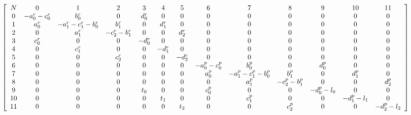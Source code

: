 \documentclass{scrartcl}
\begin{document}
\begin{landscape}
\begin{align*}
  \tiny
  &\left[ {\begin{array}{ccccccccccccc}
N & 0 & 1 & 2 & 3 & 4 & 5 & 6 & 7 & 8 & 9 & 10 & 11 \\
0 &  -a_0^r - c_0^r  & b_0^r & 0 & d_0^r & 0 & 0 & 0 & 0 & 0 & 0 & 0 & 0 \\
1 & a_0^r &  -a_1^r - c_1^r - b_0^r & b_1^r & 0 & d_1^r & 0 & 0 & 0 & 0 & 0 & 0 & 0 \\
2 & 0 & a_1^r &  - c_2^r - b_1^r & 0 & 0 & d_2^r & 0 & 0 & 0 & 0 & 0 & 0 \\
3 & c_0^r & 0 & 0 &  -d_0^r  & 0 & 0 & 0 & 0 & 0 & 0 & 0 & 0 \\
4 & 0 & c_1^r & 0 & 0 &  -d_1^r  & 0 & 0 & 0 & 0 & 0 & 0 & 0 \\
5 & 0 & 0 & c_2^r & 0 & 0 &  -d_2^r  & 0 & 0 & 0 & 0 & 0 & 0 \\
6 & 0 & 0 & 0 & 0 & 0 & 0 &  -a_0^p- c_0^p &  b_0^p & 0 & d_0^p & 0 & 0 \\
7 & 0 & 0 & 0 & 0 & 0 & 0 & a_0^p &  -a_1^p - c_1^p-b_0^p &  b_1^p & 0 & d_1^p & 0 \\
8 & 0 & 0 & 0 & 0 & 0 & 0 & 0 & a_1^p &  - c_2^p - b_1^p & 0 & 0 & d_2^p \\
9 &0 & 0 & 0 &  t_0 & 0 & 0 & c_0^p & 0 & 0 &  -d_0^p - l_0 & 0 & 0 \\
10 & 0 & 0 & 0 & 0 & t_1 & 0 & 0 & c_1^p & 0 & 0 &  -d_1^p - l_1 & 0 \\
11 & 0 & 0 & 0 & 0 & 0 & t_2 & 0 & 0 & c_2^p & 0 & 0 &  -d_2^p - l_2 \\
\end{array} } \right]
\end{align*}
\end{landscape}
\end{document}
